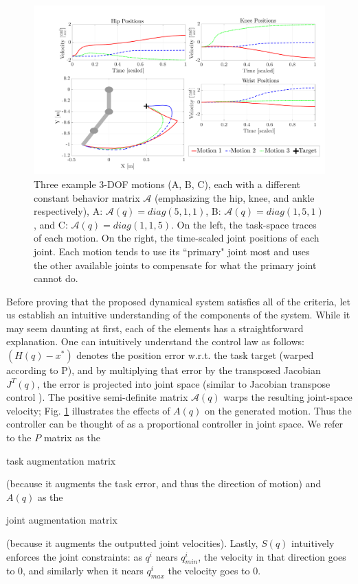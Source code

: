 \documentclass[letterpaper, 10 pt, conference,fleqn]{ieeeconf}
\begin{document}
\begin{figure}[t]
\centering
\includegraphics[width=\linewidth]{Pic/A_comparison_positions.pdf}
\caption{Three example 3-DOF motions (A, B, C), each with a different constant behavior matrix $\mathcal{A}$ (emphasizing the hip, knee, and ankle respectively), A: $\mathcal{A}(q)=diag(5,1,1) $, B: $\mathcal{A}(q)=diag(1,5,1)$, and C: $\mathcal{A}(q)=diag(1,1,5)$. On the left, the task-space traces of each motion. On the right, the time-scaled joint positions of each joint. Each motion tends to use its ``primary" joint most and uses the other available joints to compensate for what the primary joint cannot do.}
\label{fig:A_example}
\vspace{-15pt}
\end{figure}

Before proving that the proposed dynamical system satisfies all of the criteria, let us establish an intuitive understanding of the components of the system. While it may seem daunting at first, each of the elements has a straightforward explanation. One can intuitively understand the control law as follows: $(H(q) - x^*)$ denotes the position error w.r.t. the task target (warped according to P), and by multiplying that error by the transposed Jacobian $J^T(q)$, the error is projected into joint space (similar to Jacobian transpose control \cite{wolovich1984computational,sciavicco1988solution}). The positive semi-definite matrix $\mathcal{A}(q)$ warps the resulting joint-space velocity; Fig. \ref{fig:A_example} illustrates the effects of  $A(q)$ on the generated motion. Thus the controller can be thought of as a proportional controller in joint space. We refer to the $P$ matrix as the \begin{bf} task augmentation matrix \end{bf}(because it augments the task error, and thus the direction of motion) and $A(q)$ as the \begin{bf} joint augmentation matrix \end{bf} (because it augments the outputted joint velocities). Lastly, $S(q)$ intuitively enforces the joint constraints: as $q^i$ nears $q^i_{min}$, the velocity in that direction goes to $0$, and similarly when it nears $q^i_{max}$ the velocity goes to $0$.
\end{document}
